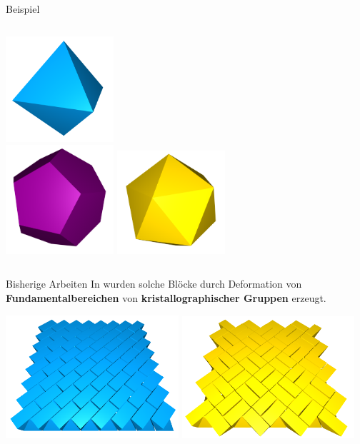 \documentclass{beamer}
\theoremstyle{plain}
\begin{document}
\begin{frame}
\begin{exampleblock}{Beispiel}
\begin{columns}
\begin{column}{0.5\textwidth}
                \includegraphics[width=0.3\textwidth]{images/oct.png} \\
                \includegraphics[width=0.3\textwidth]{images/dodec.png}
                \includegraphics[width=0.3\textwidth]{images/ico.png}
            \end{column}
    \end{columns}
    \end{exampleblock}
\end{frame}

\begin{frame}
    \begin{block}{Bisherige Arbeiten}
        In \cite{GoertzenPhD} wurden solche Blöcke durch Deformation von \textbf{Fundamentalbereichen} von  \textbf{kristallographischer Gruppen} erzeugt.
    \end{block}
    \includegraphics[width=0.48\textwidth]{images/p1.png}
    \includegraphics[width=0.48\textwidth]{images/p4.png}
\end{frame}
\end{document}
